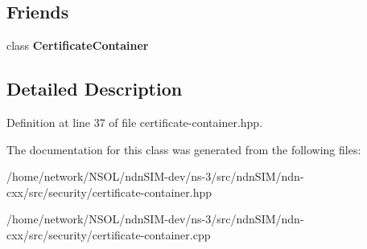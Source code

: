 \subsection*{Friends}
\begin{DoxyCompactItemize}
\item 
class {\bfseries Certificate\+Container}\hypertarget{classndn_1_1security_1_1CertificateContainer_1_1const__iterator_a7eb56ab29eec61cfee75c9fb83251fbe}{}\label{classndn_1_1security_1_1CertificateContainer_1_1const__iterator_a7eb56ab29eec61cfee75c9fb83251fbe}

\end{DoxyCompactItemize}


\subsection{Detailed Description}


Definition at line 37 of file certificate-\/container.\+hpp.



The documentation for this class was generated from the following files\+:\begin{DoxyCompactItemize}
\item 
/home/network/\+N\+S\+O\+L/ndn\+S\+I\+M-\/dev/ns-\/3/src/ndn\+S\+I\+M/ndn-\/cxx/src/security/certificate-\/container.\+hpp\item 
/home/network/\+N\+S\+O\+L/ndn\+S\+I\+M-\/dev/ns-\/3/src/ndn\+S\+I\+M/ndn-\/cxx/src/security/certificate-\/container.\+cpp\end{DoxyCompactItemize}
